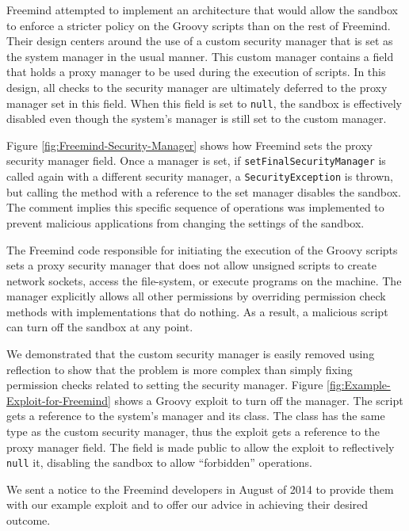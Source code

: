 \documentclass{sig-alternate}
\begin{document}
Freemind attempted to implement an architecture that would allow the
sandbox to enforce a stricter policy on the Groovy scripts than on
the rest of Freemind. Their design centers around the use of a custom
security manager that is set as the system manager in the usual manner.
This custom manager contains a field that holds a proxy manager to be used during the execution of
scripts. In this design, all checks to the security manager are ultimately
deferred to the proxy manager set in this field. When
this field is set to \texttt{null}, the sandbox is effectively disabled
even though the system's manager is still set to the custom manager.

Figure \ref{fig:Freemind-Security-Manager} shows how Freemind sets
the proxy security manager field.
Once a manager is set, if \texttt{setFinalSecurityManager} is called
again with a different security manager, a \texttt{SecurityException}
is thrown, but calling the method with a reference to the set manager disables the sandbox. The comment implies this specific sequence
of operations was implemented to prevent malicious applications from
changing the settings of the sandbox.

The Freemind code responsible for initiating the execution of the
Groovy scripts sets a proxy security manager that does not allow unsigned
scripts to create network sockets, access the file-system, or execute
programs on the machine. The manager explicitly allows all other permissions by overriding permission check methods with implementations that do nothing. As a result, a malicious script can turn off the sandbox at any point.

We demonstrated that the custom security manager is easily removed
using reflection to show that the problem is more complex than simply
fixing permission checks related to setting the security manager. Figure \ref{fig:Example-Exploit-for-Freemind}
shows a Groovy exploit to turn off the manager. The script gets a reference to the system's manager
and its class. The class has the same type as the custom security
manager, thus the exploit gets a reference to the proxy manager field.
The field is made public to allow the exploit to reflectively \texttt{null}
it, disabling the sandbox to allow ``forbidden'' operations.

We sent a notice to the Freemind developers in August of 2014 to provide
them with our example exploit and to offer our advice in achieving
their desired outcome. 
\end{document}
